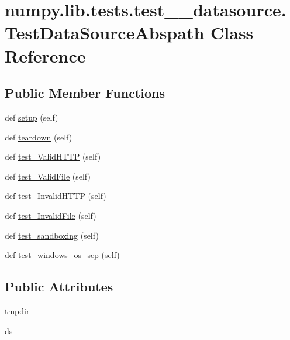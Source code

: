 \hypertarget{classnumpy_1_1lib_1_1tests_1_1test____datasource_1_1TestDataSourceAbspath}{}\section{numpy.\+lib.\+tests.\+test\+\_\+\+\_\+datasource.\+Test\+Data\+Source\+Abspath Class Reference}
\label{classnumpy_1_1lib_1_1tests_1_1test____datasource_1_1TestDataSourceAbspath}
\subsection*{Public Member Functions}
\begin{DoxyCompactItemize}
\item 
def \hyperlink{classnumpy_1_1lib_1_1tests_1_1test____datasource_1_1TestDataSourceAbspath_a5febc729812e56c6a162b18d3e370f60}{setup} (self)
\item 
def \hyperlink{classnumpy_1_1lib_1_1tests_1_1test____datasource_1_1TestDataSourceAbspath_aca528cd0d16471da187b52b3b2df800c}{teardown} (self)
\item 
def \hyperlink{classnumpy_1_1lib_1_1tests_1_1test____datasource_1_1TestDataSourceAbspath_a5faa9431064d8f77ee181d8eb9c3d5e6}{test\+\_\+\+Valid\+H\+T\+TP} (self)
\item 
def \hyperlink{classnumpy_1_1lib_1_1tests_1_1test____datasource_1_1TestDataSourceAbspath_a3aa80bc149abbf5984839917c55d2e2c}{test\+\_\+\+Valid\+File} (self)
\item 
def \hyperlink{classnumpy_1_1lib_1_1tests_1_1test____datasource_1_1TestDataSourceAbspath_aab0fc15e69cdc820278f05d6cbf855bb}{test\+\_\+\+Invalid\+H\+T\+TP} (self)
\item 
def \hyperlink{classnumpy_1_1lib_1_1tests_1_1test____datasource_1_1TestDataSourceAbspath_a93ff47276f756e4dcb7c6e5df8d3d64f}{test\+\_\+\+Invalid\+File} (self)
\item 
def \hyperlink{classnumpy_1_1lib_1_1tests_1_1test____datasource_1_1TestDataSourceAbspath_a3512cf44558fd2218427dfc116ce59a5}{test\+\_\+sandboxing} (self)
\item 
def \hyperlink{classnumpy_1_1lib_1_1tests_1_1test____datasource_1_1TestDataSourceAbspath_a1f218b9652d76eb2f89a448499b8720f}{test\+\_\+windows\+\_\+os\+\_\+sep} (self)
\end{DoxyCompactItemize}
\subsection*{Public Attributes}
\begin{DoxyCompactItemize}
\item 
\hyperlink{classnumpy_1_1lib_1_1tests_1_1test____datasource_1_1TestDataSourceAbspath_af995e40f6c9bdb5dd46490a3aa7a6b0a}{tmpdir}
\item 
\hyperlink{classnumpy_1_1lib_1_1tests_1_1test____datasource_1_1TestDataSourceAbspath_a101c9db9641da68737d5d048786628d9}{ds}
\end{DoxyCompactItemize}


